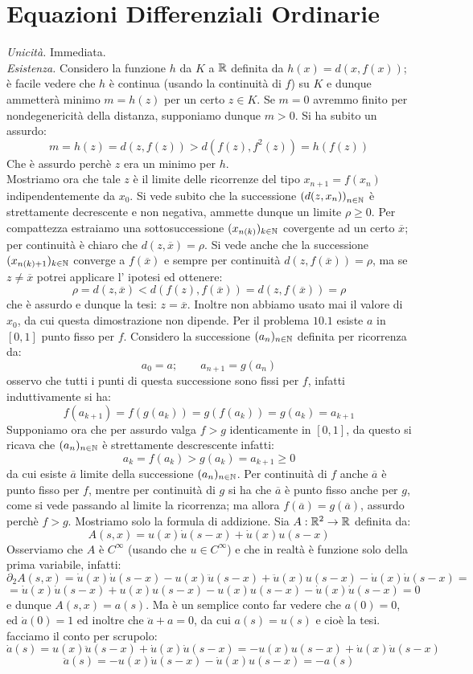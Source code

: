 \section{Equazioni Differenziali Ordinarie}
 {\it Unicità.} Immediata.\\
{\it Esistenza.} Considero la funzione $h$ da $K$ a $\mathbb{R}$ definita da $h(x)=d(x,f(x))$; è facile vedere che $h$ è continua (usando la continuità di $f$) su $K$ e dunque ammetterà minimo $m=h(z)$ per un certo $z\in K$. Se $m=0$ avremmo finito per nondegenericità della distanza, supponiamo dunque $m>0$. Si ha subito un assurdo:
$$
m=h(z)=d(z,f(z))>d(f(z),f^2(z))=h(f(z))
$$ 
Che è assurdo perchè $z$ era un minimo per $h$.\\
Mostriamo ora che tale $z$ è il limite delle ricorrenze del tipo $x_{n+1}=f(x_n)$ indipendentemente da $x_0$. Si vede subito che la successione $\left (d(z,x_n) \right )_{n\in\mathbb{N}}$ è strettamente decrescente e non negativa, ammette dunque un limite $\rho\geq 0$. Per compattezza estraiamo una sottosuccessione $(x_{n(k)})_{k\in\mathbb{N}}$ covergente ad un certo $\overline{x}$; per continuità è chiaro che $d(z,\overline{x})=\rho$. Si vede anche che la successione $(x_{n(k)+1})_{k\in\mathbb{N}}$ converge a $f(\overline{x})$ e sempre per continuità $d(z,f(\overline{x}))=\rho$, ma se $z\neq\overline{x}$ potrei applicare l' ipotesi ed ottenere:
$$
\rho=d(z,\overline{x})<d(f(z),f(\overline{x}))=d(z,f(\overline{x}))=\rho
$$
che è assurdo e dunque la tesi: $z=\overline{x}$. Inoltre non abbiamo usato mai il valore di $x_0$, da cui questa dimostrazione non dipende.
 Per il problema $10.1$ esiste $a$ in $[0,1]$ punto fisso per $f$. Considero la successione $(a_n)_{n\in\mathbb{N}}$ definita per ricorrenza da:
$$
a_0=a;\qquad a_{n+1}=g(a_n)
$$
osservo che tutti i punti di questa successione sono fissi per $f$, infatti induttivamente si ha:
$$
f(a_{k+1})=f(g(a_k))=g(f(a_k))=g(a_k)=a_{k+1}
$$
Supponiamo ora che per assurdo valga $f>g$ identicamente in $[0,1]$, da questo si ricava che $(a_n)_{n\in\mathbb{N}}$ è strettamente descrescente infatti:
$$
a_k=f(a_k)>g(a_k)=a_{k+1}\geq 0
$$
da cui esiste $\overline{a}$ limite della successione $(a_n)_{n\in\mathbb{N}}$. Per continuità di $f$ anche $\overline{a}$ è punto fisso per $f$, mentre per continuità di $g$ si ha che $\overline{a}$ è punto fisso anche per $g$, come si vede passando al limite la ricorrenza; ma allora $f(\overline{a})=g(\overline{a})$, assurdo perchè $f>g$.
 Mostriamo solo la formula di addizione. Sia $A: \mathbb{R}^2\rightarrow \mathbb{R}$ definita da:
$$
A(s,x)=u(x)\dot{u}(s-x)+\dot{u}(x)u(s-x)
$$
Osserviamo che $A$ è $C^{\infty}$ (usando che $u\in C^{\infty}$) e che in realtà è funzione solo della prima variabile, infatti:
$$
{\partial_2 A}(s,x)=\dot{u}(x)\dot{u}(s-x)-u(x)\ddot{u}(s-x)+\ddot{u}(x)u(s-x)-\dot{u}(x)\dot{u}(s-x)=
$$
$$
=\dot{u}(x)\dot{u}(s-x)+u(x){u}(s-x)-{u}(x)u(s-x)-\dot{u}(x)\dot{u}(s-x)=0
$$
e dunque $A(s,x)=a(s)$. Ma è un semplice conto far vedere che $a(0)=0$, ed $\dot{a}(0)=1$ ed inoltre che $\ddot{a}+a=0$, da cui $a(s)=u(s)$ e cioè la tesi. facciamo il conto per scrupolo:
$$
\dot{a}(s)=u(x)\ddot{u}(s-x)+\dot{u}(x)\dot{u}(s-x)=-u(x){u}(s-x)+\dot{u}(x)\dot{u}(s-x)
$$
$$
\ddot{a}(s)=-u(x)\dot{u}(s-x)-\dot{u}(x){u}(s-x)=-a(s)
$$
